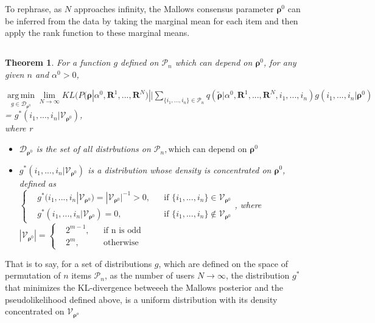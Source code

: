 \documentclass[11pt, oneside]{article}   	%
\newtheorem{theorem}{Theorem}[subsection]
\begin{document}
To rephrase, as $N$ approaches infinity, the Mallows consensus parameter $\bm{\rho}^0$ can be inferred from the data by taking the marginal mean for each item and then apply the rank function to these marginal means.
\subsection{ }
\begin{theorem}\label{theorem:V}
	For a function $g$ defined on $\mathcal{P}_n$ which can depend on $\bm{\rho}^0$, for any given $n$ and $\alpha^0 > 0$,

 $\operatorname*{arg\,min}\limits_{g\in\mathcal{D}_{\bm{\rho}^0}}\lim\limits_{N \rightarrow \infty} KL (P(\bm{\rho}|\alpha^0, \bm{R}^1, ...,\bm{R}^N ) || \sum\limits_{\{i_1,..., i_n\} \in \mathcal{P}_n} q (\tilde{\bm{\rho}}|\alpha^0, \bm{R}^1,..., \bm{R}^N, i_1,...,i_n) g(i_1,...,i_n|\bm{\rho}^0)$ \\
= $g^*(i_1,...,i_n|\mathcal{V}_{{\bm{\rho}}^0})$, \\ 
where r
\begin{itemize}
	\item{
		$\mathcal{D}_{\bm{\rho}^0}$ is the set of all distrbutions on $\mathcal{P}_n, \text{which can depend on } \bm{\rho}^0$ 
	}
	\item{
		$g^*(i_1, ..., i_n | \mathcal{V}_{\bm{\rho}^0})$ is a distribution whose density is concentrated on $\bm{\rho}^0$, defined as \\
		  $
		\left \{
		\begin{aligned}
		&g^*(i_1, ..., i_n | \mathcal{V}_{\bm{\rho}^0}) = |\mathcal{V}_{\bm{\rho}^0}|^{-1}>0 , && \text{if } \{i_1,...,i_n\}\in \mathcal{V}_{\bm{\rho}^0}\\
		&g^*(i_1, ..., i_n | \mathcal{V}_{\bm{\rho}^0}) = 0 , && \text{if } \{i_1,...,i_n\}\notin \mathcal{V}_{\bm{\rho}^0}
		\end{aligned} \right.
		$, where $|\mathcal{V}_{\bm{\rho}^0}|
			= \left \{
			\begin{aligned}
			&2^{m-1}, && \text{if n is odd} \\
			&2^m, && \text{otherwise}
			\end{aligned} \right.
			$
	}

\end{itemize}

\end{theorem}
That is to say, for a set of distributions $g$, which are defined on the space of permutation of $n$ items $\mathcal{P}_n$, as the number of users $N \rightarrow \infty$, the distribution $g^*$ that minimizes the KL-divergence betweeeh the Mallows posterior and the pseudolikelihood defined above, is a uniform distribution with its density concentrated on $\mathcal{V}_{\bm{\rho}^o}$
\end{document}
